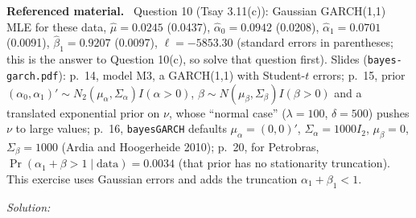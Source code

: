 \documentclass[11pt,a4paper]{article}
\newif\ifsolucoes
\newcommand{\espacoresol}{4.5cm}   %
\newenvironment{refmat}{\par\smallskip\noindent\begin{minipage}{\linewidth}\small\textbf{Referenced material.}~}{\end{minipage}\par\smallskip}
\newcommand{\resolespaco}{\ifsolucoes\else\par\textit{Solution:}\vspace{\espacoresol}\par\fi}
\begin{document}
\begin{refmat}
Question 10 (Tsay 3.11(c)): Gaussian GARCH(1,1) MLE for these data, $\hat\mu=0.0245$ (0.0437),
$\hat\alpha_0=0.0942$ (0.0208), $\hat\alpha_1=0.0701$ (0.0091), $\hat\beta_1=0.9207$ (0.0097), $\ell=-5853.30$
(standard errors in parentheses; this is the answer to Question 10(c), so solve that question first).
Slides (\texttt{bayes-garch.pdf}): p.~14, model M3, a GARCH(1,1) with Student-$t$ errors; p.~15, prior
$(\alpha_0,\alpha_1)'\sim N_2(\mu_\alpha,\Sigma_\alpha)I(\alpha>0)$, $\beta\sim N(\mu_\beta,\Sigma_\beta)I(\beta>0)$ and a
translated exponential prior on $\nu$, whose ``normal case'' ($\lambda=100$, $\delta=500$) pushes $\nu$ to
large values; p.~16, \texttt{bayesGARCH} defaults $\mu_\alpha=(0,0)'$, $\Sigma_\alpha=1000I_2$, $\mu_\beta=0$,
$\Sigma_\beta=1000$ (Ardia and Hoogerheide 2010); p.~20, for Petrobras, $\Pr(\alpha_1+\beta>1\mid\text{data})=0.0034$
(that prior has no stationarity truncation). This exercise uses Gaussian errors and adds the truncation $\alpha_1+\beta_1<1$.
\end{refmat}
\resolespaco
\end{document}

